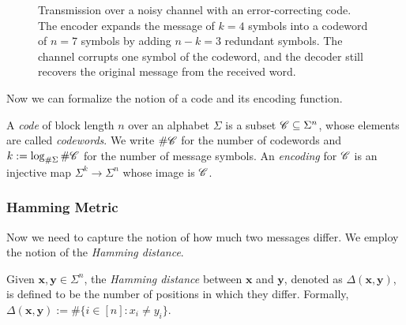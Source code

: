 \documentclass[../../book]{subfiles}
\begin{document}
\begin{figure}[ht]
    \caption{Transmission over a noisy channel with an error-correcting code. The encoder expands the message of $k = 4$ symbols into a codeword of $n = 7$ symbols by adding $n - k = 3$ redundant symbols. The channel corrupts one symbol of the codeword, and the decoder still recovers the original message from the received word.}
    \label{fig:ecc-channel}
\end{figure}
 
Now we can formalize the notion of a code and its encoding function.
\begin{definition}[Code]\label{def:code}
  A \emph{code} of block length $n$ over an alphabet $\Sigma$ is a subset $\mathscr{C} \subseteq \Sigma^n$, whose elements are called \emph{codewords}. 
  We write $\#\mathscr{C}$ for the number of codewords and $k := \log_{\#\Sigma} \#\mathscr{C}$ for the number of message symbols. 
  An \emph{encoding} for $\mathscr{C}$ is an injective map $\Sigma^k \to \Sigma^n$ whose image is $\mathscr{C}$.
\end{definition}

\subsubsection{Hamming Metric}

Now we need to capture the notion of how much two messages differ.
We employ the notion of the \emph{Hamming distance}.

\begin{definition}\label{def:hamming-distance}
  Given $\mathbf{x}, \mathbf{y} \in \Sigma^n$, the \emph{Hamming distance} between $\mathbf{x}$ and $\mathbf{y}$, denoted as $\Delta(\mathbf{x}, \mathbf{y})$, is defined to be the number of positions in which they differ. Formally, $\Delta(\mathbf{x}, \mathbf{y}) := \#\{i \in [n]: x_i \neq y_i\}$.
\end{definition}
\end{document}
